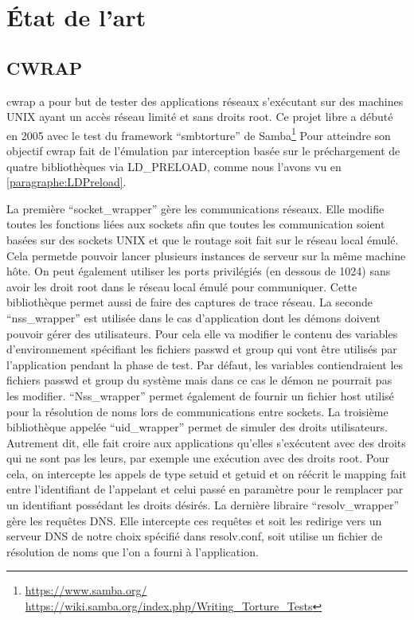 \section{État de l'art}
\label{section:sota}
\subsection{CWRAP}

cwrap\citep{cwrap, cwrap_bis} a pour but de tester des applications réseaux s'exécutant sur des machines UNIX ayant un accès réseau limité et sans droits root. Ce projet libre a débuté en 2005 avec le test du framework ``smbtorture'' de Samba\footnote{\url{https://www.samba.org/} \\ \url{https://wiki.samba.org/index.php/Writing\_Torture\_Tests}} Pour atteindre son objectif cwrap fait de l'émulation par interception basée sur le préchargement de quatre bibliothèques via LD\_PRELOAD, comme nous l'avons vu en \ref{paragraphe:LDPreload}.

La première ``socket\_wrapper'' gère les communications réseaux. Elle modifie toutes les fonctions liées aux sockets afin que toutes les communication soient basées sur des sockets UNIX et que le routage soit fait sur le réseau local émulé. Cela permetde pouvoir lancer plusieurs instances de serveur sur la même machine hôte. On peut également utiliser les ports privilégiés (en dessous de 1024) sans avoir les droit root dans le réseau local émulé pour communiquer. Cette bibliothèque permet aussi de faire des captures de trace réseau. La seconde ``nss\_wrapper'' est utilisée dans le cas d'application dont les démons doivent pouvoir gérer des utilisateurs. Pour cela elle va modifier le contenu des variables d'environnement spécifiant les fichiers passwd et group qui vont être utilisés par l'application pendant la phase de test. Par défaut, les variables contiendraient les fichiers passwd et group du système mais dans ce cas le démon ne pourrait pas les modifier. ``Nss\_wrapper'' permet également de fournir un fichier host utilisé pour la résolution de noms lors de communications entre sockets. La troisième bibliothèque appelée ``uid\_wrapper'' permet de simuler des droits utilisateurs. Autrement dit, elle fait croire aux applications qu'elles s'exécutent avec des droits qui ne sont pas les leurs, par exemple une exécution avec des droits root. Pour cela, on intercepte les appels de type setuid et getuid et on réécrit le mapping fait entre l'identifiant de l'appelant et celui passé en paramètre pour le remplacer par un identifiant possédant les droits désirés. La dernière libraire ``resolv\_wrapper'' gère les requêtes DNS. Elle intercepte ces requêtes et soit les redirige vers un serveur DNS de notre choix spécifié dans resolv.conf, soit utilise un fichier de résolution de noms que l'on a fourni à l'application.

